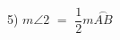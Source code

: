 \documentclass[preview]{standalone}
\begin{document}
\begin{center}
5) $m\angle{2}$ $=$ $\dfrac{1}{2}$$m\overset{\frown}{AB}$
\end{center}
\end{document}
